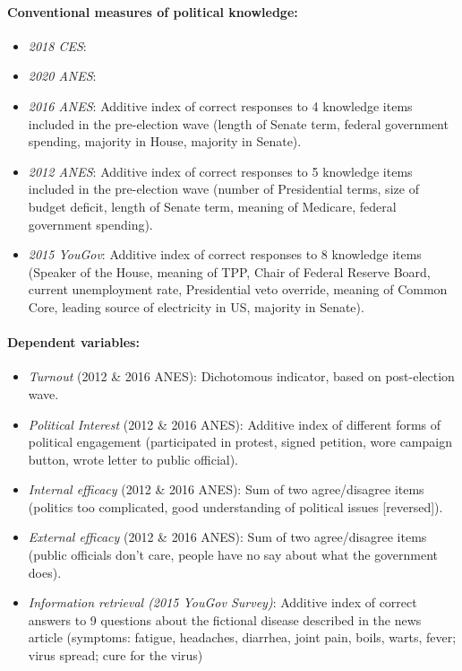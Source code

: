 \paragraph{Conventional measures of political knowledge:}
\begin{itemize}
	\item \textit{2018 CES}:
	\item \textit{2020 ANES}:
	\item \textit{2016 ANES}: Additive index of correct responses to 4 knowledge items included in the pre-election wave (length of Senate term, federal government spending, majority in House, majority in Senate). %
	\item \textit{2012 ANES}: Additive index of correct responses to 5 knowledge items included in the pre-election wave (number of Presidential terms, size of budget deficit, length of Senate term, meaning of Medicare, federal government spending). %
	\item \textit{2015 YouGov}: Additive index of correct responses to 8 knowledge items (Speaker of the House, meaning of TPP, Chair of Federal Reserve Board, current unemployment rate, Presidential veto override, meaning of Common Core, leading source of electricity in US, majority in Senate). %
\end{itemize}

\paragraph{Dependent variables:}
\begin{itemize}
	\item \textit{Turnout} (2012 \& 2016 ANES): Dichotomous indicator, based on post-election wave.
	\item \textit{Political Interest} (2012 \& 2016 ANES): Additive index of different forms of political engagement (participated in protest, signed petition, wore campaign button, wrote letter to public official).
	\item \textit{Internal efficacy} (2012 \& 2016 ANES): Sum of two agree/disagree items (politics too complicated, good understanding of political issues [reversed]).
	\item \textit{External efficacy} (2012 \& 2016 ANES): Sum of two agree/disagree items (public officials don't care, people have no say about what the government does).
	\item \textit{Information retrieval (2015 YouGov Survey)}: Additive index of correct answers to 9 questions about the fictional disease described in the news article (symptoms: fatigue, headaches, diarrhea, joint pain, boils, warts, fever; virus spread; cure for the virus)
\end{itemize}

